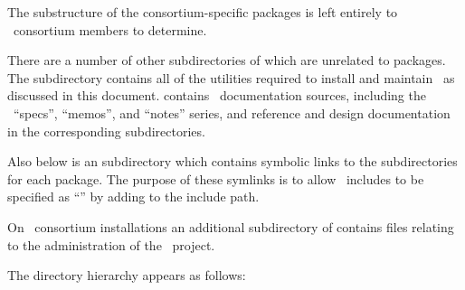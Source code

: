 The substructure of the consortium-specific packages is left entirely to
\casa\ consortium members to determine.

There are a number of other subdirectories of  which are
unrelated to packages.  The  subdirectory contains all of the
utilities required to install and maintain \casa\ as discussed in this
document.   contains \casa\ documentation sources, including the
\casa\ ``specs'', ``memos'', and ``notes'' series, and reference and design
documentation in the corresponding subdirectories.

Also below  is an  subdirectory which
contains symbolic links to the  subdirectories for each
package.  The purpose of these symlinks is to allow \casa\ includes to be
specified as ``'' by adding
\mbox{} to the include path.

On \casa\ consortium installations an additional  subdirectory
of  contains files relating to the administration of the
\casa\ project.

The  directory hierarchy appears as follows:

